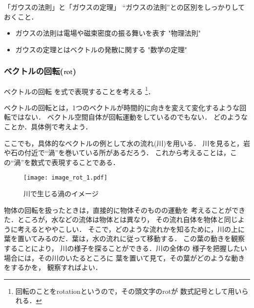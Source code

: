         \begin{memo}{「ガウスの法則」と「ガウスの定理」}
           “ガウスの法則”との区別をしっかりしておくこと．
           \begin{itemize}
               \item ガウスの法則は電場や磁束密度の振る舞いを表す "物理法則"
               \item ガウスの定理とはベクトルの発散に関する "数学の定理"
           \end{itemize}
        \end{memo}

        \subsubsection{ベクトルの回転($\rm{rot}$)}
        ベクトルの回転
        を式で表現することを考える
            \footnote{
                回転のことをrotationというので，その頭文字のrotが
                数式記号として用いられる．
            }．

        ベクトルの回転とは，1つのベクトルが時間的に向きを変えて変化するような回転ではない．
        ベクトル空間自体が回転運動をしているのでもない．
        どのようなことか．具体例で考えよう．

        ここでも，具体的なベクトルの例として水の流れ(川)を用いる．
        川を見ると，岩や石の付近で“渦”を巻いている所があるだろう．
        これから考えることは，この“渦”を数式で表現することである．
                \begin{figure}[hbt]
                    \begin{center}
                        \texttt{[image: image\_rot\_1.pdf]}
                        \caption{川で生じる渦のイメージ}
                        \label{fig:image_rot_1}
                    \end{center}
                \end{figure}

        物体の回転を扱ったときは，直接的に物体そのものの運動を
        考えることができた．ところが，水などの流体は物体とは異なり，
        その流れ自体を物体と同じように考えるとややこしい．
        そこで，どのような流れかを知るために，川の上に
        葉を置いてみるのだ．葉は，水の流れに従って移動する．
        この葉の動きを観察することにより，
        川の様子を探ることができる．川の全体の
        様子を把握したい場合には，その川のいたるところに
        葉を置いて見て，その葉がどのような動きをするかを，
        観察すればよい．

